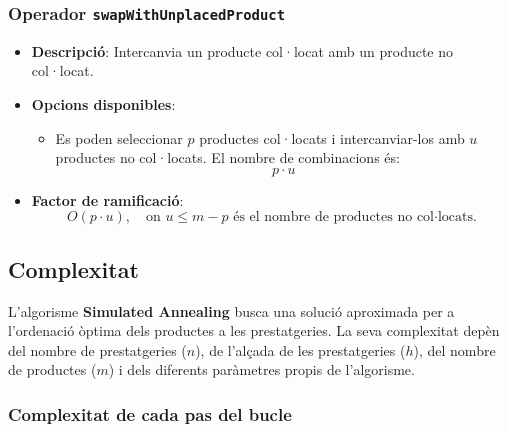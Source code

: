 \documentclass[a4paper,12pt]{report}
\begin{document}
\begin{itemize}
\subsubsection{Operador \texttt{swapWithUnplacedProduct}}
\begin{itemize}
    \item \textbf{Descripció}: Intercanvia un producte col·locat amb un producte no col·locat.
    \item \textbf{Opcions disponibles}: 
    \begin{itemize}
        \item Es poden seleccionar \(p\) productes col·locats i intercanviar-los amb \(u\) productes no col·locats. El nombre de combinacions és:
        \[
        p \cdot u
        \]
    \end{itemize}
    \item \textbf{Factor de ramificació}:
    \[
    O(p \cdot u), \quad \text{on } u \leq m - p \text{ és el nombre de productes no col·locats.}
    \]
\end{itemize}

\subsection{Complexitat}

L'algorisme \textbf{Simulated Annealing} busca una solució aproximada per a l'ordenació òptima dels productes a les prestatgeries. La seva complexitat depèn del nombre de prestatgeries (\(n\)), de l'alçada de les prestatgeries (\(h\)), del nombre de productes (\(m\)) i dels diferents paràmetres propis de l'algorisme.

\subsubsection{Complexitat de cada pas del bucle}


\end{itemize}
\end{document}

